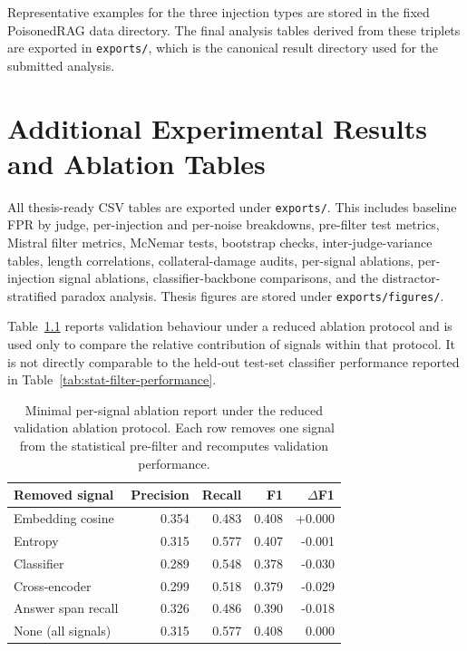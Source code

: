 Representative examples for the three injection types are stored in the fixed
PoisonedRAG data directory. The final analysis tables derived from these
triplets are exported in \texttt{exports/}, which is the canonical result
directory used for the submitted analysis.

\chapter{Additional Experimental Results and Ablation Tables}
\label{app:additional-results}

All thesis-ready CSV tables are exported under \texttt{exports/}. This includes
baseline FPR by judge, per-injection and per-noise breakdowns, pre-filter test
metrics, Mistral filter metrics, McNemar tests, bootstrap checks,
inter-judge-variance tables, length correlations, collateral-damage audits,
per-signal ablations, per-injection signal ablations, classifier-backbone
comparisons, and the distractor-stratified paradox analysis. Thesis figures are
stored under \texttt{exports/figures/}.

Table~\ref{tab:appendix-signal-ablation} reports validation behaviour under a
reduced ablation protocol and is used only to compare the relative contribution
of signals within that protocol. It is not directly comparable to the held-out
test-set classifier performance reported in Table~\ref{tab:stat-filter-performance}.

\begin{table}[H]
\centering
\small
\caption{Minimal per-signal ablation report under the reduced validation ablation protocol. Each row removes one signal from the statistical pre-filter and recomputes validation performance.}
\label{tab:appendix-signal-ablation}
\begin{tabular}{lrrrr}
\toprule
Removed signal & Precision & Recall & F1 & $\Delta$F1 \\
\midrule
Embedding cosine & 0.354 & 0.483 & 0.408 & +0.000 \\
Entropy & 0.315 & 0.577 & 0.407 & -0.001 \\
Classifier & 0.289 & 0.548 & 0.378 & -0.030 \\
Cross-encoder & 0.299 & 0.518 & 0.379 & -0.029 \\
Answer span recall & 0.326 & 0.486 & 0.390 & -0.018 \\
None (all signals) & 0.315 & 0.577 & 0.408 & 0.000 \\
\bottomrule
\end{tabular}
\end{table}

